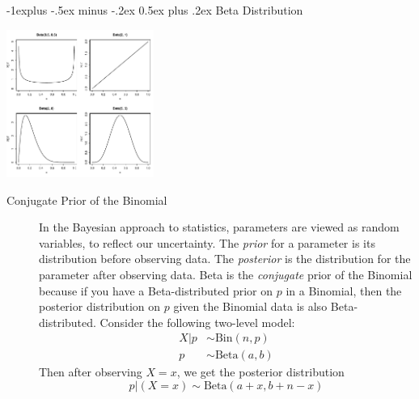 \documentclass[10pt,landscape]{article}
\makeatletter
\newcommand{\Bin}{\textrm{Bin}}
\newcommand{\Beta}{\textrm{Beta}}
\renewcommand{\subsection}{\@startsection{subsection}{2}{0mm}%
{-1explus -.5ex minus -.2ex}%
{0.5ex plus .2ex}%
{\normalfont\normalsize\bfseries}}
\makeatother
\begin{document}
\begin{multicols*}{3}
\begin{description}

        \end{description}

        \subsection{Beta Distribution}
        \begin{minipage}{\linewidth}
            \centering
            \includegraphics[width=1.9in]{figures/Betapdfs.pdf}
        \end{minipage}
        \medskip

        \begin{description}
            \item[Conjugate Prior of the Binomial] In the Bayesian approach to statistics, parameters are viewed as random variables, to reflect our uncertainty. The \emph{prior} for a parameter is its distribution before observing data. The \emph{posterior}  is the distribution for the parameter after observing data. Beta is the \emph{conjugate} prior of the Binomial because if you have a Beta-distributed prior on $p$ in a Binomial, then the posterior distribution on $p$ given the Binomial data is also Beta-distributed. Consider the following two-level model:
            \begin{align*}
                X|p & \sim \Bin(n, p)  \\
                p   & \sim \Beta(a, b)
            \end{align*}
            Then after observing  $X = x$, we get the posterior distribution
            \[p|(X=x) \sim \Beta(a + x, b + n - x) \]


\end{description}
\end{multicols*}
\end{document}
